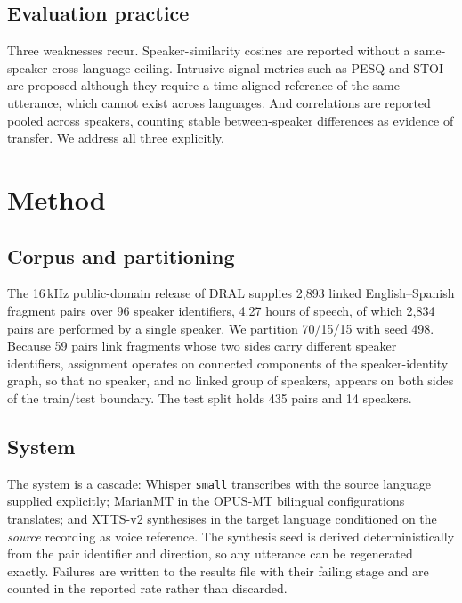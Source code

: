 \documentclass[journal]{IEEEtran}
\begin{document}
\subsection{Evaluation practice}
Three weaknesses recur. Speaker-similarity cosines are reported without a same-speaker
cross-language ceiling. Intrusive signal metrics such as PESQ and STOI are proposed although they
require a time-aligned reference of the same utterance, which cannot exist across languages. And
correlations are reported pooled across speakers, counting stable between-speaker differences as
evidence of transfer. We address all three explicitly.

\section{Method}

\subsection{Corpus and partitioning}
The 16\,kHz public-domain release of DRAL \cite{ward2023dral} supplies 2{,}893 linked
English--Spanish fragment pairs over 96 speaker identifiers, 4.27 hours of speech, of which 2{,}834
pairs are performed by a single speaker. We partition 70/15/15 with seed 498. Because 59 pairs link
fragments whose two sides carry different speaker identifiers, assignment operates on connected
components of the speaker-identity graph, so that no speaker, and no linked group of speakers,
appears on both sides of the train/test boundary. The test split holds 435 pairs and 14 speakers.

\subsection{System}
The system is a cascade: Whisper \texttt{small} \cite{radford2023whisper} transcribes with the
source language supplied explicitly; MarianMT \cite{junczysdowmunt2018marian} in the OPUS-MT
bilingual configurations \cite{tiedemann2020opusmt} translates; and XTTS-v2 \cite{casanova2024xtts}
synthesises in the target language conditioned on the \emph{source} recording as voice reference.
The synthesis seed is derived deterministically from the pair identifier and direction, so any
utterance can be regenerated exactly. Failures are written to the results file with their failing
stage and are counted in the reported rate rather than discarded.
\end{document}
